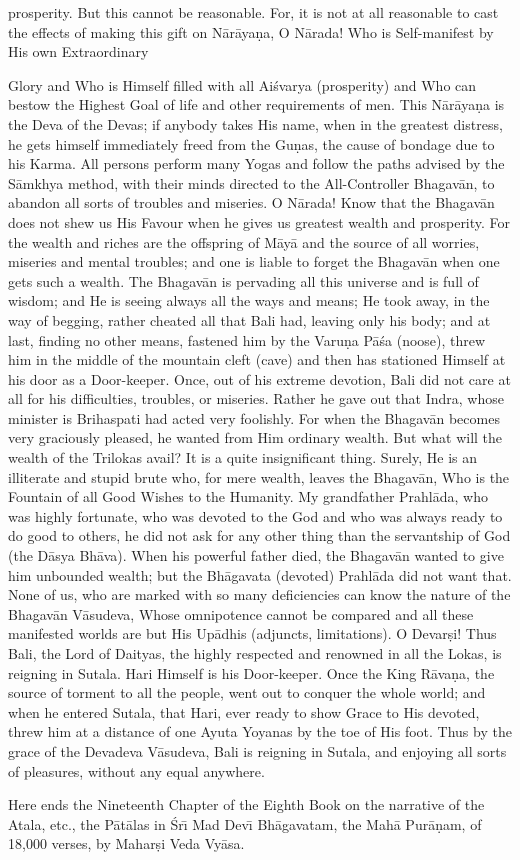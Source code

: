 prosperity. But this cannot be reasonable. For, it is not at all reasonable to cast the effects of making this gift on N\=ar\=aya\d{n}a, O N\=arada! Who is Self-manifest by His own Extraordinary

Glory and Who is Himself filled with all Ai\'svarya (prosperity) and Who can bestow the Highest Goal of life and other requirements of men. This N\=ar\=aya\d{n}a is the Deva of the Devas; if anybody takes His name, when in the greatest distress, he gets himself immediately freed from the Gu\d{n}as, the cause of bondage due to his Karma. All persons perform many Yogas and follow the paths advised by the S\=amkhya method, with their minds directed to the All-Controller Bhagav\=an, to abandon all sorts of troubles and miseries. O N\=arada! Know that the Bhagav\=an does not shew us His Favour when he gives us greatest wealth and prosperity. For the wealth and riches are the offspring of M\=ay\=a and the source of all worries, miseries and mental troubles; and one is liable to forget the Bhagav\=an when one gets such a wealth. The Bhagav\=an is pervading all this universe and is full of wisdom; and He is seeing always all the ways and means; He took away, in the way of begging, rather cheated all that Bali had, leaving only his body; and at last, finding no other means, fastened him by the Varu\d{n}a P\=a\'sa (noose), threw him in the middle of the mountain cleft (cave) and then has stationed Himself at his door as a Door-keeper. Once, out of his extreme devotion, Bali did not care at all for his difficulties, troubles, or miseries. Rather he gave out that Indra, whose minister is Brihaspati had acted very foolishly. For when the Bhagav\=an becomes very graciously pleased, he wanted from Him ordinary wealth. But what will the wealth of the Trilokas avail? It is a quite insignificant thing. Surely, He is an illiterate and stupid brute who, for mere wealth, leaves the Bhagav\=an, Who is the Fountain of all Good Wishes to the Humanity. My grandfather Prahl\=ada, who was highly fortunate, who was devoted to the God and who was always ready to do good to others, he did not ask for any other thing than the servantship of God (the D\=asya Bh\=ava). When his powerful father died, the Bhagav\=an wanted to give him unbounded wealth; but the Bh\=agavata (devoted) Prahl\=ada did not want that. None of us, who are marked with so many deficiencies can know the nature of the Bhagav\=an V\=asudeva, Whose omnipotence cannot be compared and all these manifested worlds are but His Up\=adhis (adjuncts, limitations). O Devar\d{s}i! Thus Bali, the Lord of Daityas, the highly respected and renowned in all the Lokas, is reigning in Sutala. Hari Himself is his Door-keeper. Once the King R\=ava\d{n}a, the source of torment to all the people, went out to conquer the whole world; and when he entered Sutala, that Hari, ever ready to show Grace to His devoted, threw him at a distance of one Ayuta Yoyanas by the toe of His foot. Thus by the grace of the Devadeva V\=asudeva, Bali is reigning in Sutala, and enjoying all sorts of pleasures, without any equal anywhere.

Here ends the Nineteenth Chapter of the Eighth Book on the narrative of the Atala, etc., the P\=at\=alas in \'Sr\={\i} Mad Dev\={\i} Bh\=agavatam, the Mah\=a Pur\=a\d{n}am, of 18,000 verses, by Mahar\d{s}i Veda Vy\=asa.



